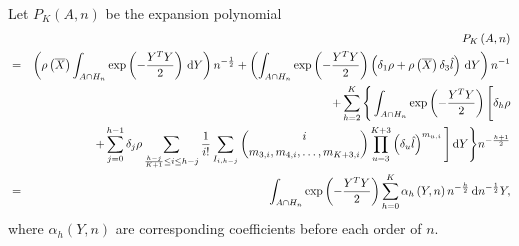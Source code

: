 \begin{comment}
the formula is wrong, need a new one. 
\end{comment}
Let $P_{K}\left(A,n\right)$ be the expansion polynomial 
\begin{eqnarray*}
 &  & P_{K}\left(A,n\right)\\
 & = & \left(\rho\left(\overline{X}\right)\int_{A\cap H_{n}}\exp\left(-\frac{Y^{T}Y}{2}\right)\,\mathrm{d} Y\right)n^{-\frac{1}{2}}+\left(\int_{A\cap H_{n}}\exp\left(-\frac{Y^{T}Y}{2}\right)\left(\delta_{1}\rho+\rho\left(\overline{X}\right)\delta_{3}\hat{l}\right)\,\mathrm{d} Y\right)n^{-1}\\
 &  & +\sum_{h=2}^{K}\Bigg\{\int_{A\cap H_{n}}\exp\left(-\frac{Y^{T}Y}{2}\right)\Bigg[\delta_{h}\rho\\
 &  & +\sum_{j=0}^{h-1}\delta_{j}\rho\sum_{\frac{h-j}{K+1}\le i\le h-j}\frac{1}{i!}\sum_{I_{i,h-j}}\binom{i}{m_{3,i},m_{4,i},\ldots,m_{K+3,i}}\prod_{u=3}^{K+3}\left(\delta_{u}\hat{l}\right)^{m_{u,i}}\Bigg]\,\mathrm{d} Y\Bigg\} n^{-\frac{h+1}{2}}\\
 & = & \int_{A\cap H_{n}}\exp\left(-\frac{Y^{T}Y}{2}\right)\sum_{h=0}^{K}\alpha_{h}\left(Y,n\right)n^{-\frac{h}{2}}\,\mathrm{d} n^{-\frac{1}{2}}Y,
\end{eqnarray*}
where $\alpha_{h}\left(Y,n\right)$ are corresponding coefficients
before each order of $n$. %
\begin{comment}
add normal case and multivariate case
\end{comment}

